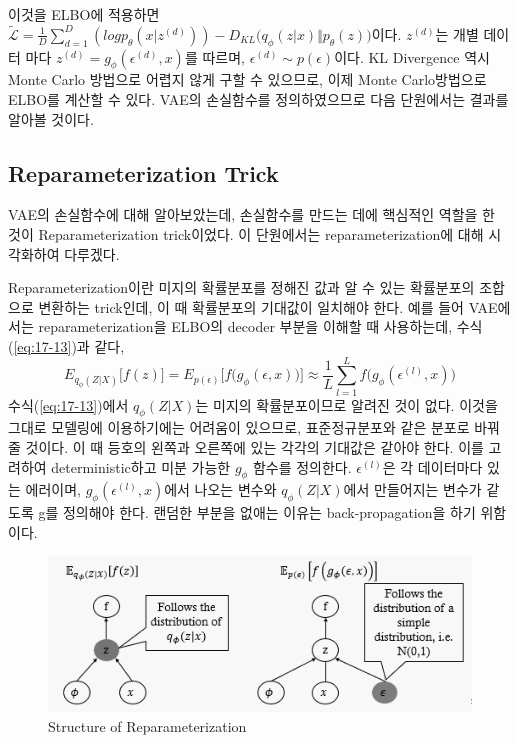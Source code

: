 \documentclass[draft=false]{oblivoir}
\begin{document}
이것을 ELBO에 적용하면 $\tilde{\mathcal{L}} = \frac{1}{D}\sum_{d=1}^{D}(logp_\theta (x|z^{(d)})) - D_{KL}\Big(q_\phi (z|x)\Vert p_\theta (z)\Big) $이다. $z^{(d)}$는 개별 데이터 마다 $z^{(d)} = g_\phi (\epsilon^{(d)}, x)$를 따르며, $\epsilon^{(d)}\sim p(\epsilon) $이다. KL Divergence 역시 Monte Carlo 방법으로 어렵지 않게 구할 수 있으므로, 이제 Monte Carlo방법으로 ELBO를 계산할 수 있다. VAE의 손실함수를 정의하였으므로 다음 단원에서는 결과를 알아볼 것이다.

\subsection{Reparameterization Trick}
VAE의 손실함수에 대해 알아보았는데, 손실함수를 만드는 데에 핵심적인 역할을 한 것이 Reparameterization trick이었다. 이 단원에서는 reparameterization에 대해 시각화하여 다루겠다.

Reparameterization이란 미지의 확률분포를 정해진 값과 알 수 있는 확률분포의 조합으로 변환하는 trick인데, 이 때 확률분포의 기대값이 일치해야 한다. 예를 들어 VAE에서는 reparameterization을 ELBO의 decoder 부분을 이해할 때 사용하는데, 수식(\ref{eq:17-13})과 같다,
\begin{equation}
	E_{q_\phi(Z|X)}\Big[f(z) \Big] = E_{p(\epsilon)}\Big[f\Big(g_\phi(\epsilon, x) \Big) \Big]
	\approx \frac{1}{L} \sum_{l=1}^L f\Big(g_\phi (\epsilon^{(l)}, x) \Big)
	\label{eq:17-13}
\end{equation}
수식(\ref{eq:17-13})에서 $q_\phi(Z|X)$는 미지의 확률분포이므로 알려진 것이 없다. 이것을 그대로 모델링에 이용하기에는 어려움이 있으므로, 표준정규분포와 같은 분포로 바꿔줄 것이다. 이 때 등호의 왼쪽과 오른쪽에 있는 각각의 기대값은 같아야 한다. 이를 고려하여 deterministic하고 미분 가능한 $g_\phi$ 함수를 정의한다. $\epsilon^{(l)}$은 각 데이터마다 있는 에러이며, $g_\phi (\epsilon^{(l)}, x)$에서 나오는 변수와 $q_\phi(Z|X)$에서 만들어지는 변수가 같도록 g를 정의해야 한다. 랜덤한 부분을 없애는 이유는 back-propagation을 하기 위함이다. 

\begin{figure}[ht] \centering
  \includegraphics[scale=1]{fig8.png}
  \caption{Structure of Reparameterization}
  \label{fig:17-8}
\end{figure}
\end{document}
